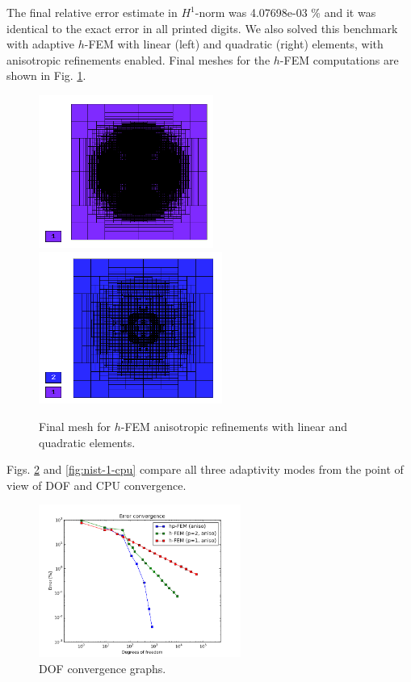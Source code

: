 \documentclass[12pt]{elsarticle}
\begin{document}
The final relative error estimate in $H^1$-norm was 4.07698e-03 \%
and it was identical to the exact error in all printed digits.
We also solved this benchmark with adaptive $h$-FEM
with linear (left) and quadratic (right)
elements, with anisotropic refinements enabled.
Final meshes for the $h$-FEM computations are shown
in Fig. \ref{fig:nist-1-h-aniso}.

\begin{figure}[!ht]
\centering
\includegraphics[height=5cm]{nist/nist-1/mesh_h1_aniso.png}\ \
\includegraphics[height=5cm]{nist/nist-1/mesh_h2_aniso.png}
\vspace{-2mm}
\caption{Final mesh for $h$-FEM anisotropic refinements with linear and quadratic elements.}
\label{fig:nist-1-h-aniso}
\end{figure}

Figs. \ref{fig:nist-1-dof} and \ref{fig:nist-1-cpu} compare all
three adaptivity modes from the point
of view of DOF and CPU convergence.

\begin{figure}[!ht]
\centering
\includegraphics[height=5cm]{nist/nist-1/conv_dof_aniso.png}
\vspace{-2mm}
\caption{DOF convergence graphs.}
\label{fig:nist-1-dof}
\end{figure}
\end{document}
